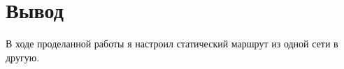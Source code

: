 \chapter{Вывод}
В ходе проделанной работы я настроил статический маршрут из одной сети в другую.
\endinput